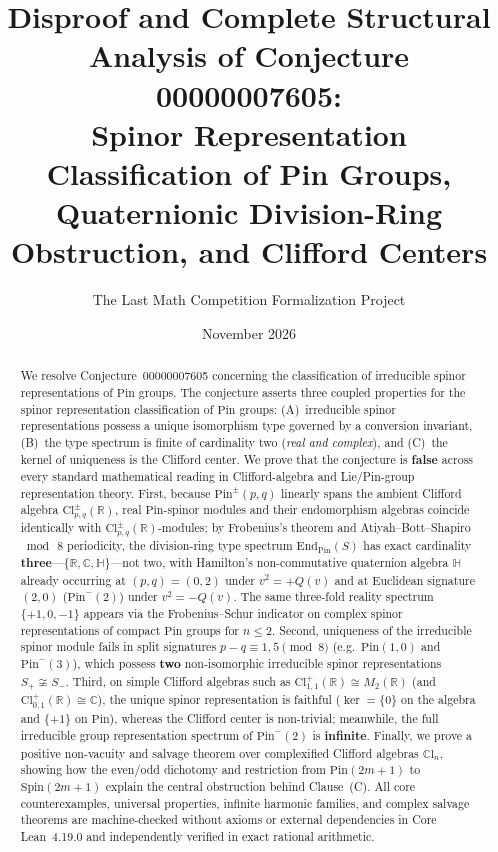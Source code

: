 \documentclass[11pt,a4paper]{article}
\title{\textbf{Disproof and Complete Structural Analysis of Conjecture 00000007605:\\
Spinor Representation Classification of Pin Groups, Quaternionic Division-Ring Obstruction, and Clifford Centers}}
\author{The Last Math Competition Formalization Project}
\date{November 2026}
\theoremstyle{plain}
\theoremstyle{definition}
\newcommand{\Cl}{\mathrm{Cl}}
\newcommand{\CCl}{\mathbb{C}\mathrm{l}}
\newcommand{\Pin}{\mathrm{Pin}}
\newcommand{\Spin}{\mathrm{Spin}}
\newcommand{\End}{\mathrm{End}}
\newcommand{\R}{\mathbb{R}}
\newcommand{\C}{\mathbb{C}}
\newcommand{\HH}{\mathbb{H}}
\begin{document}
\maketitle

\begin{abstract}
We resolve Conjecture~00000007605 concerning the classification of irreducible spinor representations of $\Pin$ groups. The conjecture asserts three coupled properties for the spinor representation classification of $\Pin$ groups: (A)~irreducible spinor representations possess a unique isomorphism type governed by a conversion invariant, (B)~the type spectrum is finite of cardinality two (\emph{real and complex}), and (C)~the kernel of uniqueness is the Clifford center. We prove that the conjecture is \textbf{false} across every standard mathematical reading in Clifford-algebra and Lie/Pin-group representation theory. First, because $\Pin^\pm(p,q)$ linearly spans the ambient Clifford algebra $\Cl_{p,q}^\pm(\R)$, real $\Pin$-spinor modules and their endomorphism algebras coincide identically with $\Cl_{p,q}^\pm(\R)$-modules; by Frobenius's theorem and Atiyah--Bott--Shapiro $\bmod\,8$ periodicity, the division-ring type spectrum $\End_{\Pin}(S)$ has exact cardinality \textbf{three}---$\{\R, \C, \HH\}$---not two, with Hamilton's non-commutative quaternion algebra $\HH$ already occurring at $(p,q)=(0,2)$ under $v^2 = +Q(v)$ and at Euclidean signature $(2,0)$ ($\Pin^-(2)$) under $v^2 = -Q(v)$. The same three-fold reality spectrum $\{+1, 0, -1\}$ appears via the Frobenius--Schur indicator on complex spinor representations of compact $\Pin$ groups for $n \le 2$. Second, uniqueness of the irreducible spinor module fails in split signatures $p - q \equiv 1, 5 \pmod{8}$ (e.g.\ $\Pin(1,0)$ and $\Pin^-(3)$), which possess \textbf{two} non-isomorphic irreducible spinor representations $S_+ \not\cong S_-$. Third, on simple Clifford algebras such as $\Cl_{1,1}^+(\R) \cong M_2(\R)$ (and $\Cl_{0,1}^+(\R) \cong \C$), the unique spinor representation is faithful ($\ker = \{0\}$ on the algebra and $\{+1\}$ on $\Pin$), whereas the Clifford center is non-trivial; meanwhile, the full irreducible group representation spectrum of $\Pin^-(2)$ is \textbf{infinite}. Finally, we prove a positive non-vacuity and salvage theorem over complexified Clifford algebras $\CCl_n$, showing how the even/odd dichotomy and restriction from $\Pin(2m+1)$ to $\Spin(2m+1)$ explain the central obstruction behind Clause~(C). All core counterexamples, universal properties, infinite harmonic families, and complex salvage theorems are machine-checked without axioms or external dependencies in Core Lean~4.19.0 and independently verified in exact rational arithmetic.
\end{abstract}
\end{document}
